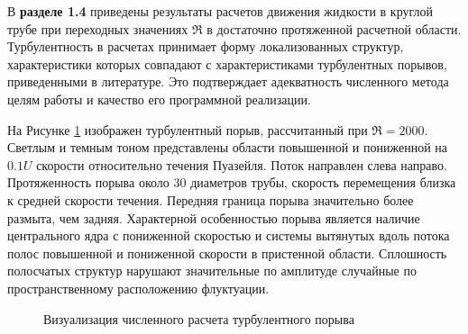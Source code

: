 В \textbf{разделе 1.4} приведены результаты расчетов движения жидкости в круглой трубе при переходных значениях $\Re$ в достаточно протяженной расчетной области. Турбулентность в расчетах принимает форму локализованных структур, характеристики которых совпадают с характеристиками турбулентных порывов, приведенными в литературе. Это подтверждает адекватность численного метода целям работы и качество его программной реализации. 

На Рисунке \ref{puff_3D_img} изображен турбулентный порыв, рассчитанный при $\Re = 2000$. Светлым и темным тоном представлены области повышенной и пониженной на $0.1U$ скорости относительно течения Пуазейля. Поток направлен слева направо. Протяженность порыва около 30 диаметров трубы, скорость перемещения близка к средней скорости течения. Передняя граница порыва значительно более размыта, чем задняя. Характерной особенностью порыва является наличие центрального ядра с пониженной скоростью и системы вытянутых вдоль потока полос повышенной и пониженной скорости в пристенной области. Сплошность полосчатых структур нарушают значительные по амплитуде случайные по пространственному расположению флуктуации.

\begin{figure}
\caption{Визуализация численного расчета турбулентного порыва}
\label{puff_3D_img}
\end{figure}
